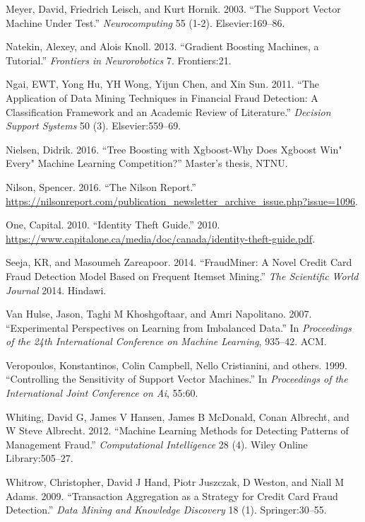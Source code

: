 \documentclass[12pt,]{article}
\begin{document}
\leavevmode\hypertarget{ref-meyer2003support}{}%
Meyer, David, Friedrich Leisch, and Kurt Hornik. 2003. ``The Support
Vector Machine Under Test.'' \emph{Neurocomputing} 55 (1-2).
Elsevier:169--86.

\leavevmode\hypertarget{ref-natekin2013gradient}{}%
Natekin, Alexey, and Alois Knoll. 2013. ``Gradient Boosting Machines, a
Tutorial.'' \emph{Frontiers in Neurorobotics} 7. Frontiers:21.

\leavevmode\hypertarget{ref-ngai2011application}{}%
Ngai, EWT, Yong Hu, YH Wong, Yijun Chen, and Xin Sun. 2011. ``The
Application of Data Mining Techniques in Financial Fraud Detection: A
Classification Framework and an Academic Review of Literature.''
\emph{Decision Support Systems} 50 (3). Elsevier:559--69.

\leavevmode\hypertarget{ref-nielsen2016tree}{}%
Nielsen, Didrik. 2016. ``Tree Boosting with Xgboost-Why Does Xgboost
Win" Every" Machine Learning Competition?'' Master's thesis, NTNU.

\leavevmode\hypertarget{ref-nilson2016nilson}{}%
Nilson, Spencer. 2016. ``The Nilson Report.''
\url{https://nilsonreport.com/publication_newsletter_archive_issue.php?issue=1096}.

\leavevmode\hypertarget{ref-capitaloneguide}{}%
One, Capital. 2010. ``Identity Theft Guide.'' 2010.
\url{https://www.capitalone.ca/media/doc/canada/identity-theft-guide.pdf}.

\leavevmode\hypertarget{ref-seeja2014fraudminer}{}%
Seeja, KR, and Masoumeh Zareapoor. 2014. ``FraudMiner: A Novel Credit
Card Fraud Detection Model Based on Frequent Itemset Mining.'' \emph{The
Scientific World Journal} 2014. Hindawi.

\leavevmode\hypertarget{ref-van2007experimental}{}%
Van Hulse, Jason, Taghi M Khoshgoftaar, and Amri Napolitano. 2007.
``Experimental Perspectives on Learning from Imbalanced Data.'' In
\emph{Proceedings of the 24th International Conference on Machine
Learning}, 935--42. ACM.

\leavevmode\hypertarget{ref-veropoulos1999controlling}{}%
Veropoulos, Konstantinos, Colin Campbell, Nello Cristianini, and others.
1999. ``Controlling the Sensitivity of Support Vector Machines.'' In
\emph{Proceedings of the International Joint Conference on Ai}, 55:60.

\leavevmode\hypertarget{ref-whiting2012machine}{}%
Whiting, David G, James V Hansen, James B McDonald, Conan Albrecht, and
W Steve Albrecht. 2012. ``Machine Learning Methods for Detecting
Patterns of Management Fraud.'' \emph{Computational Intelligence} 28
(4). Wiley Online Library:505--27.

\leavevmode\hypertarget{ref-whitrow2009transaction}{}%
Whitrow, Christopher, David J Hand, Piotr Juszczak, D Weston, and Niall
M Adams. 2009. ``Transaction Aggregation as a Strategy for Credit Card
Fraud Detection.'' \emph{Data Mining and Knowledge Discovery} 18 (1).
Springer:30--55.
\end{document}
